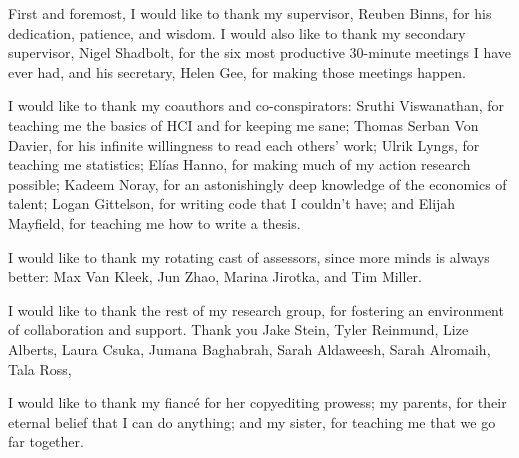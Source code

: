First and foremost, I would like to thank my supervisor, Reuben Binns, for his dedication, patience, and wisdom. I would also like to thank my secondary supervisor, Nigel Shadbolt, for the six most productive 30-minute meetings I have ever had, and his secretary, Helen Gee, for making those meetings happen.

I would like to thank my coauthors and co-conspirators: Sruthi Viswanathan, for teaching me the basics of HCI and for keeping me sane; Thomas Serban Von Davier, for his infinite willingness to read each others' work; Ulrik Lyngs, for teaching me statistics; Elías Hanno, for making much of my action research possible; Kadeem Noray, for an astonishingly deep knowledge of the economics of talent; Logan Gittelson, for writing code that I couldn't have; and Elijah Mayfield, for teaching me how to write a thesis.

I would like to thank my rotating cast of assessors, since more minds is always better: Max Van Kleek, Jun Zhao, Marina Jirotka, and Tim Miller.

I would like to thank the rest of my research group, for fostering an environment of collaboration and support. Thank you Jake Stein, Tyler Reinmund, Lize Alberts, Laura Csuka, Jumana Baghabrah, Sarah Aldaweesh, Sarah Alromaih, Tala Ross, 

I would like to thank my fiancé for her copyediting prowess; my parents, for their eternal belief that I can do anything; and my sister, for teaching me that we go far together.